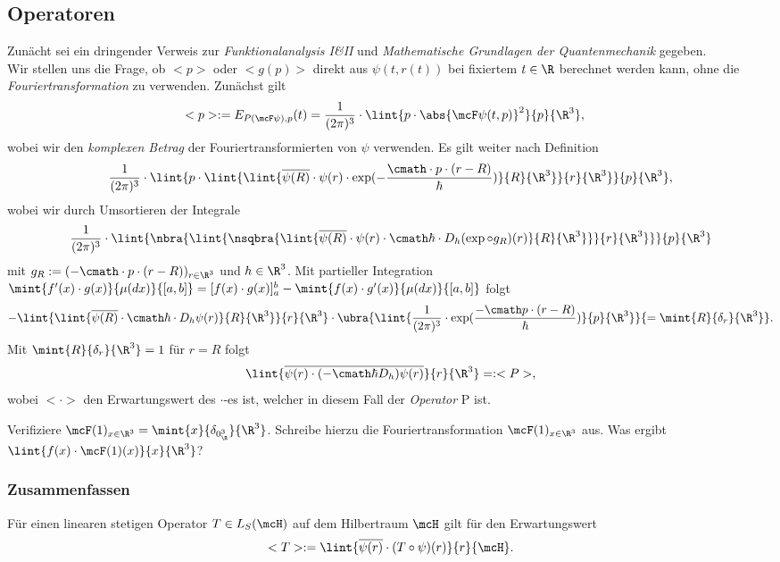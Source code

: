 \documentclass{subfiles}
\begin{document}

    \subsection{Operatoren}
        Zunächt sei ein dringender Verweis zur \emph{Funktionalanalysis I\&II} und \emph{Mathematische Grundlagen der Quantenmechanik} gegeben. \\

        Wir stellen uns die Frage, ob $<p>$ oder $<g(p)>$ direkt aus $\psi(t,r(t))$ bei fixiertem $t\in\R$ berechnet werden kann, ohne die \emph{Fouriertransformation} zu verwenden. Zunächst gilt 
        \begin{align*}
            <p>:= E_{P(\mcF\psi),p}(t) &= \frac{1}{(2\pi)^3}\cdot\lint{p\cdot\abs{\mcF\psi(t,p)}^2}{p}{\R^3}, 
        \end{align*}
        wobei wir den \emph{komplexen Betrag} der Fouriertransformierten von $\psi$ verwenden. Es gilt weiter nach Definition
        \[\frac{1}{(2\pi)^3}\cdot\lint{p\cdot\lint{\lint{\overline{\psi(R)}\cdot\psi(r)\cdot\exp(-\frac{\cmath\cdot p\cdot (r-R)}{\hbar})}{R}{\R^3}}{r}{\R^3}}{p}{\R^3},\]
        wobei wir durch Umsortieren der Integrale 
        \[\frac{1}{(2\pi)^3}\cdot\lint{\nbra{\lint{\nsqbra{\lint{\overline{\psi(R)}\cdot\psi(r)\cdot \cmath\hbar\cdot D_h(\exp\circ g_R)(r)}{R}{\R^3}}}{r}{\R^3}}}{p}{\R^3}\]
        mit $g_R:=(-\cmath\cdot p\cdot(r-R))_{r\in\R^3}$ und $h\in\R^3$. Mit partieller Integration $\mint{f'(x)\cdot g(x)}{\mu(dx)}{[a,b]} = [f(x)\cdot g(x)]_a^b-\mint{f(x)\cdot g'(x)}{\mu(dx)}{[a,b]}$ folgt
        \[-\lint{\lint{\overline{\psi(R)}\cdot\cmath\hbar\cdot D_h\psi(r)}{R}{\R^3}}{r}{\R^3}\cdot\ubra{\lint{\frac{1}{(2\pi)^3}\cdot\exp(\frac{-\cmath p\cdot(r-R)}{\hbar})}{p}{\R^3}}{=\mint{R}{\delta_r}{\R^3}}.\]
        Mit $\mint{R}{\delta_r}{\R^3} = 1$ für $r=R$ folgt 
        \[\lint{\overline{\psi(r)\cdot(-\cmath\hbar D_h)\psi(r)}}{r}{\R^3} =: <P>,\]
        wobei $<\cdot>$ den Erwartungswert des $\cdot$-es ist, welcher in diesem Fall der \emph{Operator} P ist. 

        \begin{Aufgabe}
            \nr{} Verifiziere $\mcF(1)_{x\in\R^3} = \mint{x}{\delta_{0_\R^3}}{\R^3}$. Schreibe hierzu die Fouriertransformation $\mcF(1)_{x\in\R^3}$ aus. Was ergibt $\lint{f(x)\cdot\mcF(1)(x)}{x}{\R^3}$? 
        \end{Aufgabe}
        \subsubsection*{Zusammenfassen}
            Für einen linearen stetigen Operator $T\in L_S(\mcH)$ auf dem Hilbertraum $\mcH$ gilt für den Erwartungswert 
            \[<T> := \lint{\overline{\psi(r)}\cdot (T\circ\psi)(r)}{r}{\mcH}.\]
\end{document}
